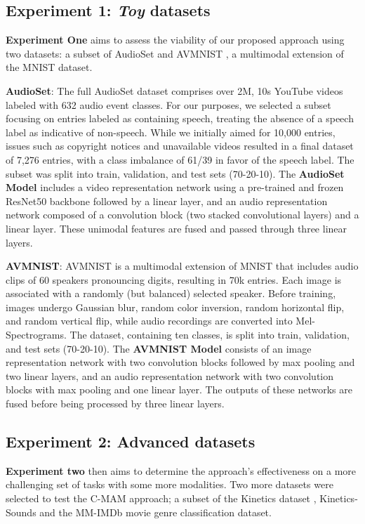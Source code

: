 \subsection{Experiment 1: \textit{Toy} datasets}


\noindent \textbf{Experiment One} aims to assess the viability of our proposed approach using two datasets: a subset of AudioSet \cite{audioset} and AVMNIST \cite{vielzeuf2018centralnet}, a multimodal extension of the MNIST dataset.

\textbf{AudioSet}: The full AudioSet dataset comprises over 2M, 10s YouTube videos labeled with 632 audio event classes. For our purposes, we selected a subset focusing on entries labeled as containing speech, treating the absence of a speech label as indicative of non-speech. While we initially aimed for 10,000 entries, issues such as copyright notices and unavailable videos resulted in a final dataset of 7,276 entries, with a class imbalance of 61/39 in favor of the speech label. The subset was split into train, validation, and test sets (70-20-10). The \textbf{AudioSet Model} includes a video representation network using a pre-trained and frozen ResNet50 backbone \cite{7780459} followed by a linear layer, and an audio representation network composed of a convolution block (two stacked convolutional layers) and a linear layer. These unimodal features are fused and passed through three linear layers.

\textbf{AVMNIST}: AVMNIST is a multimodal extension of MNIST that includes audio clips of 60 speakers pronouncing digits, resulting in 70k entries. Each image is associated with a randomly (but balanced) selected speaker. Before training, images undergo Gaussian blur, random color inversion, random horizontal flip, and random vertical flip, while audio recordings are converted into Mel-Spectrograms. The dataset, containing ten classes, is split into train, validation, and test sets (70-20-10). The \textbf{AVMNIST Model} consists of an image representation network with two convolution blocks followed by max pooling and two linear layers, and an audio representation network with two convolution blocks with max pooling and one linear layer. The outputs of these networks are fused before being processed by three linear layers.

\subsection{Experiment 2: Advanced datasets}
\textbf{Experiment two} then aims to determine the approach's effectiveness on a more challenging set of tasks with some more modalities. Two more datasets were selected to test the C-MAM approach; a subset of the Kinetics dataset \cite{kinetics}, Kinetics-Sounds \cite{kinetics_sounds} and the MM-IMDb \cite{arevalo2017gated} movie genre classification dataset. 


